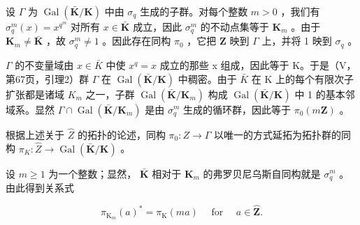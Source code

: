 设 \(\Gamma\) 为 \(\operatorname{Gal}(\bar{\mathbf{K}} / \mathbf{K})\) 中由 \(\sigma_q\) 生成的子群。对每个整数 \(m > 0\) ，我们有 \(\sigma_q^m (x) = x^{q^m}\) 对所有 \(x\in \bar{\mathbf{K}}\) 成立，因此 \(\sigma_q^m\) 的不动点集等于 \(\mathbf{K}_m\) 。由于 \(\mathbf{K}_m\neq \bar{\mathbf{K}}\) ，故 \(\sigma_q^m\neq 1\) 。因此存在同构 \(\pi_0\) ，它把 \(\mathbf{Z}\) 映到 \(\Gamma\) 上，并将 1 映到 \(\sigma_q\) 。

\(\Gamma\) 的不变量域由 \(x \in \bar{K}\) 中使 \(x^{q} = x\) 成立的那些 x 组成，因此等于 K。于是（V，第67页，引理2）群 \(\Gamma\) 在 \(\operatorname{Gal}(\bar{\mathbf{K}}/\mathbf{K})\) 中稠密。由于 \(\bar{K}\) 在 K 上的每个有限次子扩张都是诸域 \(K_{m}\) 之一，子群 \(\operatorname{Gal}(\bar{\mathbf{K}}/\mathbf{K}_{m})\) 构成 \(\operatorname{Gal}(\bar{\mathbf{K}}/\mathbf{K})\) 中 1 的基本邻域系。显然 \(\Gamma \cap \operatorname{Gal}(\bar{\mathbf{K}}/\mathbf{K}_{m})\) 是由 \(\sigma_{q}^{m}\) 生成的循环群，因此等于 \(\pi_{0}(m\mathbf{Z})\) 。

根据上述关于 \(\hat{Z}\) 的拓扑的论述，同构 \(\pi_{0}:Z\to\Gamma\) 以唯一的方式延拓为拓扑群的同构 \(\pi_{K}:\hat{Z}\to\operatorname{Gal}(\bar{\mathbf{K}}/\mathbf{K})\) 。

设 \(m \geqslant 1\) 为一个整数；显然， \(\bar{\mathbf{K}}\) 相对于 \(\mathbf{K}_m\) 的弗罗贝尼乌斯自同构就是 \(\sigma_q^m\) 。由此得到关系式

\[
\pi_ {\mathrm{K} _ {m}} (a) ^ {*} = \pi_ {\mathrm{K}} (m a) \quad \text { for } \quad a \in \hat {\mathbf {Z}}.\tag{5}
\]


